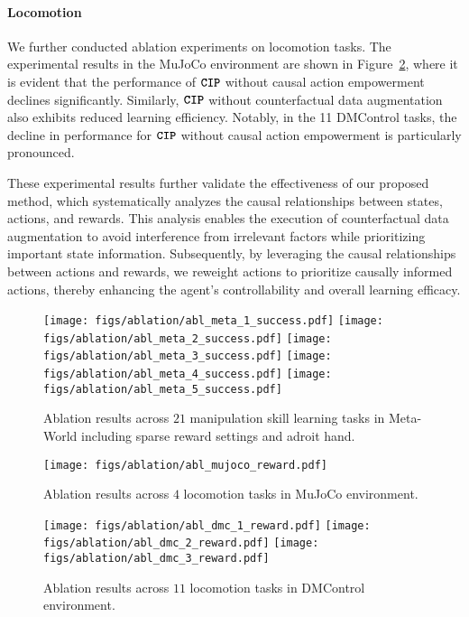 \paragraph{Locomotion}
We further conducted ablation experiments on locomotion tasks. The experimental results in the MuJoCo environment are shown in Figure~\ref{fig:appendix_abl_mujoco}, where it is evident that the performance of $\texttt{\textbf{CIP}}$ without causal action empowerment declines significantly. Similarly, $\texttt{\textbf{CIP}}$ without counterfactual data augmentation also exhibits reduced learning efficiency. Notably, in the 11 DMControl tasks, the decline in performance for $\texttt{\textbf{CIP}}$ without causal action empowerment is particularly pronounced. 

These experimental results further validate the effectiveness of our proposed method, which systematically analyzes the causal relationships between states, actions, and rewards. This analysis enables the execution of counterfactual data augmentation to avoid interference from irrelevant factors while prioritizing important state information. Subsequently, by leveraging the causal relationships between actions and rewards, we reweight actions to prioritize causally informed actions, thereby enhancing the agent’s controllability and overall learning efficacy.


\begin{figure}[t]
    \centering
    \texttt{[image: figs/ablation/abl\_meta\_1\_success.pdf]}
    \texttt{[image: figs/ablation/abl\_meta\_2\_success.pdf]}
    \texttt{[image: figs/ablation/abl\_meta\_3\_success.pdf]}
    \texttt{[image: figs/ablation/abl\_meta\_4\_success.pdf]}
    \texttt{[image: figs/ablation/abl\_meta\_5\_success.pdf]} 
    \caption{Ablation results across $21$ manipulation skill learning tasks in Meta-World including sparse reward settings and adroit hand.}
    \label{fig:appendix_abl_manipulation}
\end{figure}

\begin{figure}[t]
    \centering
    \texttt{[image: figs/ablation/abl\_mujoco\_reward.pdf]}
    \caption{Ablation results across $4$ locomotion tasks in MuJoCo environment.}
    \label{fig:appendix_abl_mujoco}
\end{figure}

\begin{figure}[t]
    \centering
    \texttt{[image: figs/ablation/abl\_dmc\_1\_reward.pdf]}
    \texttt{[image: figs/ablation/abl\_dmc\_2\_reward.pdf]}
    \texttt{[image: figs/ablation/abl\_dmc\_3\_reward.pdf]}
    \caption{Ablation results across $11$ locomotion tasks in DMControl environment.}
    \label{fig:appendix_abl_dmc}
\end{figure}


